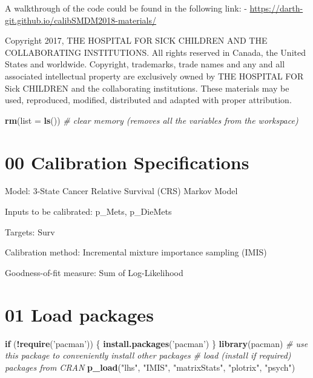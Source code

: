 \documentclass[
]{article}
\newenvironment{Shaded}{\begin{snugshade}}{\end{snugshade}}
\newcommand{\CommentTok}[1]{\textcolor[rgb]{0.56,0.35,0.01}{\textit{#1}}}
\newcommand{\ControlFlowTok}[1]{\textcolor[rgb]{0.13,0.29,0.53}{\textbf{#1}}}
\newcommand{\DataTypeTok}[1]{\textcolor[rgb]{0.13,0.29,0.53}{#1}}
\newcommand{\KeywordTok}[1]{\textcolor[rgb]{0.13,0.29,0.53}{\textbf{#1}}}
\newcommand{\NormalTok}[1]{#1}
\newcommand{\OperatorTok}[1]{\textcolor[rgb]{0.81,0.36,0.00}{\textbf{#1}}}
\newcommand{\StringTok}[1]{\textcolor[rgb]{0.31,0.60,0.02}{#1}}
\begin{document}
A walkthrough of the code could be found in the following link: -
\url{https://darth-git.github.io/calibSMDM2018-materials/}

Copyright 2017, THE HOSPITAL FOR SICK CHILDREN AND THE COLLABORATING
INSTITUTIONS. All rights reserved in Canada, the United States and
worldwide. Copyright, trademarks, trade names and any and all associated
intellectual property are exclusively owned by THE HOSPITAL FOR Sick
CHILDREN and the collaborating institutions. These materials may be
used, reproduced, modified, distributed and adapted with proper
attribution.

\newpage

\begin{Shaded}
\begin{Highlighting}[]
\KeywordTok{rm}\NormalTok{(}\DataTypeTok{list =} \KeywordTok{ls}\NormalTok{())      }\CommentTok{# clear memory (removes all the variables from the workspace)}
\end{Highlighting}
\end{Shaded}

\hypertarget{calibration-specifications}{%
\section{00 Calibration
Specifications}\label{calibration-specifications}}

Model: 3-State Cancer Relative Survival (CRS) Markov Model

Inputs to be calibrated: p\_Mets, p\_DieMets

Targets: Surv

Calibration method: Incremental mixture importance sampling (IMIS)

Goodness-of-fit measure: Sum of Log-Likelihood

\hypertarget{load-packages}{%
\section{01 Load packages}\label{load-packages}}

\begin{Shaded}
\begin{Highlighting}[]
\ControlFlowTok{if}\NormalTok{ (}\OperatorTok{!}\KeywordTok{require}\NormalTok{(}\StringTok{'pacman'}\NormalTok{)) \{}
  \KeywordTok{install.packages}\NormalTok{(}\StringTok{'pacman'}\NormalTok{)}
\NormalTok{\}}
\KeywordTok{library}\NormalTok{(pacman) }\CommentTok{# use this package to conveniently install other packages}
\CommentTok{# load (install if required) packages from CRAN}
\KeywordTok{p_load}\NormalTok{(}\StringTok{"lhs"}\NormalTok{, }\StringTok{"IMIS"}\NormalTok{, }\StringTok{"matrixStats"}\NormalTok{, }\StringTok{"plotrix"}\NormalTok{, }\StringTok{"psych"}\NormalTok{)  }
\end{Highlighting}
\end{Shaded}
\end{document}
